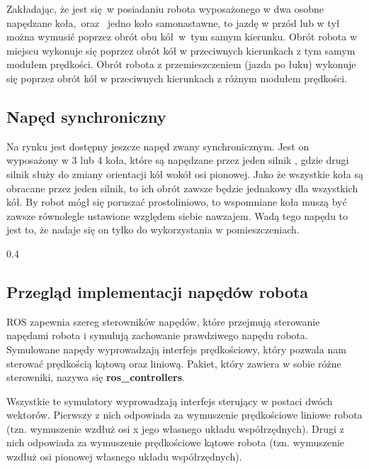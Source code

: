 {{        Zakładając, że jest się w posiadaniu robota wyposażonego w dwa osobne napędzane koła,~oraz~ jedno koło samonastawne, to jazdę w przód lub w tył można wymusić poprzez obrót obu kół~w~tym samym kierunku. Obrót robota w miejscu wykonuje się poprzez obrót kół w przeciwnych kierunkach z tym samym modułem prędkości. Obrót robota z przemieszczeniem (jazda po łuku) wykonuje się poprzez obrót kół w przeciwnych kierunkach z różnym modułem prędkości.
        
    }
    \subsection{Napęd synchroniczny}
    {
        Na rynku jest dostępny jeszcze napęd zwany synchronicznym. Jest on wyposażony w 3 lub 4 koła, które są napędzane przez jeden silnik \cite{sync_drive}, gdzie drugi silnik służy do zmiany orientacji kół wokół osi pionowej. Jako że wszystkie koła są obracane przez jeden silnik, to ich obrót zawsze będzie jednakowy dla wszystkich kół. By robot mógł się poruszać prostoliniowo, to wspomniane koła muszą być zawsze równolegle ustawione względem siebie nawzajem. Wadą tego napędu to jest to, że nadaje się on tylko do wykorzystania w pomieszczeniach.


         {0.4}      
    }
    \newpage
    \subsection{Przegląd implementacji napędów robota}
    {
    ROS zapewnia szereg sterowników napędów, które przejmują sterowanie napędami robota \cite{ros_controllers} i symulują zachowanie prawdziwego napędu robota. Symulowane napędy wyprowadzają interfejs prędkościowy, który pozwala nam sterować prędkością kątową oraz liniową. Pakiet, który zawiera w sobie różne sterowniki, nazywa się \textbf{ros\_controllers}.
    
    Wszystkie te symulatory wyprowadzają interfejs sterujący w postaci dwóch wektorów. Pierwszy z nich odpowiada za wymuszenie prędkościowe liniowe robota (tzn. wymuszenie wzdłuż osi x jego własnego układu współrzędnych). Drugi z nich odpowiada za wymuszenie prędkościowe kątowe robota (tzn. wymuszenie wzdłuż osi pionowej własnego układu współrzędnych).

}}
